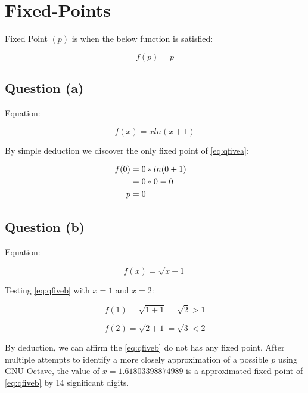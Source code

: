 \section{Fixed-Points}

	Fixed Point $(p)$ is when the below function is satisfied:

	\begin{equation}
		f(p) = p
	\label{eq:fixedpoint}
	\end{equation}

	\subsection{Question (a)}
		
		Equation:

		\begin{equation}
			f(x) = xln(x+1)
		\label{eq:qfivea}
		\end{equation}

		By simple deduction we discover the only fixed point of \cref{eq:qfivea}:

		\begin{align}
			f(0) &= 0*ln(0+1)& \notag \\
			&= 0*0 = 0& \notag \\
			p &= 0&
			\label{eq:qfiveaded}
		\end{align}

	\subsection{Question (b)}
		
		Equation:

		\begin{equation}
			f(x) = \sqrt{x+1}
		\label{eq:qfiveb}
		\end{equation}

		Testing \cref{eq:qfiveb} with $x = 1$ and $x = 2$:

		\begin{equation}
			f(1) = \sqrt{1+1} = \sqrt{2} > 1
		\label{eq:qfivebone}
		\end{equation}

		\begin{equation}
			f(2) = \sqrt{2+1} = \sqrt{3} < 2
		\label{eq:qfivebtwo}
		\end{equation}

		By deduction, we can affirm the \cref{eq:qfiveb} do not has any fixed point. After multiple attempts to identify a more closely approximation of a possible $p$ using GNU Octave, the value of $x = 1.61803398874989$ is a approximated fixed point of \cref{eq:qfiveb} by 14 significant digits.
